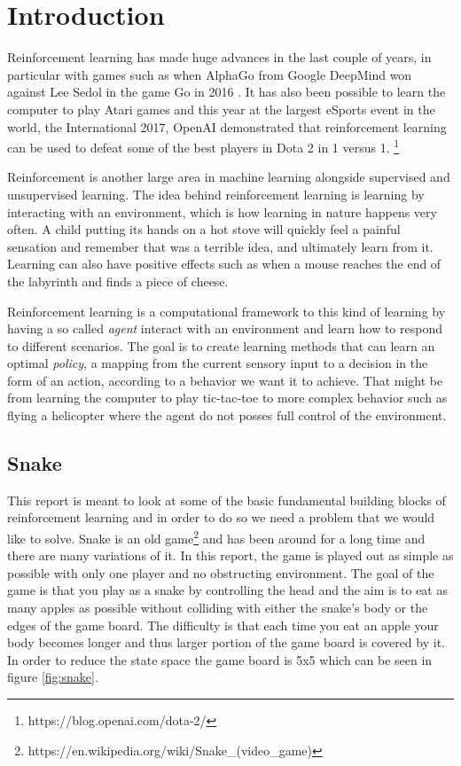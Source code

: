 \documentclass[report.tex]{subfiles}
\begin{document}
    \section*{\centering Introduction}

    Reinforcement learning has made huge advances in the last couple of years, in particular with games such as when AlphaGo from Google DeepMind won against Lee Sedol in the game Go in 2016 \cite{silver2016mastering}. It has also been possible to learn the computer to play Atari games \cite{mnih2013playing} and this year at the largest eSports event in the world, the International 2017, OpenAI demonstrated that reinforcement learning can be used to defeat some of the best players in Dota 2 in 1 versus 1. \footnote{https://blog.openai.com/dota-2/}

    Reinforcement is another large area in machine learning alongside supervised and unsupervised learning. The idea behind reinforcement learning is learning by interacting with an environment, which is how learning in nature happens very often. A child putting its hands on a hot stove will quickly feel a painful sensation and remember that was a terrible idea, and ultimately learn from it. Learning can also have positive effects such as when a mouse reaches the end of the labyrinth and finds a piece of cheese.

    Reinforcement learning is a computational framework to this kind of learning by having a so called \textit{agent} interact with an environment and learn how to respond to different scenarios. The goal is to create learning methods that can learn an optimal \textit{policy}, a mapping from the current sensory input to a decision in the form of an action, according to a behavior we want it to achieve. That might be from learning the computer to play tic-tac-toe to more complex behavior such as flying a helicopter where the agent do not posses full control of the environment.

    \subsection*{Snake}

    This report is meant to look at some of the basic fundamental building blocks of reinforcement learning and in order to do so we need a problem that we would like to solve. Snake is an old game\footnote{https://en.wikipedia.org/wiki/Snake\_(video\_game)} and has been around for a long time and there are many variations of it. In this report, the game is played out as simple as possible with only one player and no obstructing environment. The goal of the game is that you play as a snake by controlling the head and the aim is to eat as many apples as possible without colliding with either the snake's body or the edges of the game board. The difficulty is that each time you eat an apple your body becomes longer and thus larger portion of the game board is covered by it. In order to reduce the state space the game board is 5x5 which can be seen in figure \ref{fig:snake}.
\end{document}

